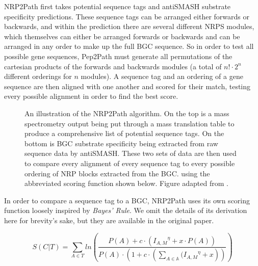 \documentclass{l4proj}
\newcommand{\scoreeqn}{
	\begin{equation} \label{eq:scoreeqn}
		S(C|T) = \sum_{A \in T}{ln\left(\dfrac{P(A) + c\cdot ({I_{A, M}}^\eta + x\cdot {P(A)})}
								 	{P(A)\cdot(1 + c \cdot (\sum_{A \in \mathbb{A}}{({I_{A, M}}^\eta} + x))}\right)}
	\end{equation}
}
\begin{document}
NRP2Path first takes potential sequence tags and antiSMASH substrate specificity predictions. These sequence tags can be arranged either forwards or backwards, and within the prediction there are several different NRPS modules, which themselves can either be arranged forwards or backwards and can be arranged in any order to make up the full BGC sequence. So in order to test all possible gene sequences, Pep2Path must generate all permutations of the cartesian products of the forwards and backwards modules (a total of \(n!\cdot2^n\) different orderings for \(n\) modules). A sequence tag and an ordering of a gene sequence are then aligned with one another and scored for their match, testing every possible alignment in order to find the best score.

\begin{figure}
    \centering

    \caption{An illustration of the NRP2Path algorithm. On the top is a mass spectrometry output being put through a mass translation table to produce
    a comprehensive list of potential sequence tags. On the bottom is BGC substrate specificity being extracted from raw sequence data by antiSMASH.
    These two sets of data are then used to compare every alignment of every sequence tag to every possible ordering of NRP blocks extracted from the 
    BGC. using the abbreviated scoring function shown below. Figure adapted from \cite{p2p}.
    }

    \label{fig:nrp2path}
\end{figure}

In order to compare a sequence tag to a BGC, NRP2Path uses its own scoring function loosely inspired by \textit{Bayes' Rule}. We omit the details of its derivation here for brevity's sake, but they are available in the original paper.

\scoreeqn
\end{document}

